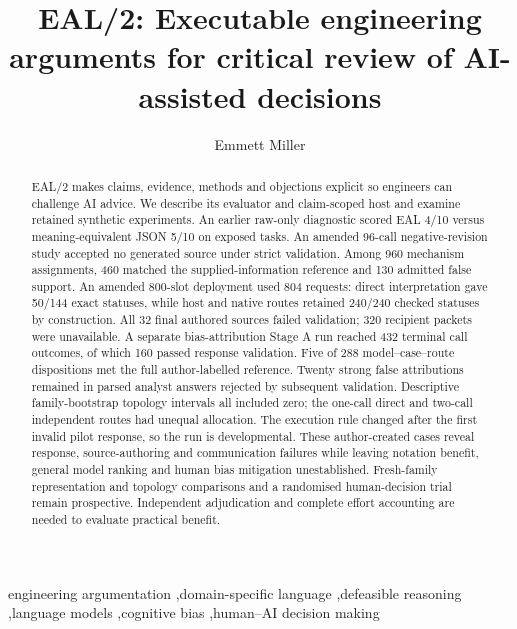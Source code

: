 \documentclass[preprint,12pt]{elsarticle}
\begin{document}
\begin{frontmatter}
\title{EAL/2: Executable engineering arguments for critical review of AI-assisted decisions}
\author[author]{Emmett Miller}
\address[author]{Affiliation and corresponding-author contact pending author confirmation}
\begin{abstract}
EAL/2 makes claims, evidence, methods and objections explicit so engineers can challenge AI advice. We describe its evaluator and claim-scoped host and examine retained synthetic experiments. An earlier raw-only diagnostic scored EAL 4/10 versus meaning-equivalent JSON 5/10 on exposed tasks. An amended 96-call negative-revision study accepted no generated source under strict validation. Among 960 mechanism assignments, 460 matched the supplied-information reference and 130 admitted false support. An amended 800-slot deployment used 804 requests: direct interpretation gave 50/144 exact statuses, while host and native routes retained 240/240 checked statuses by construction. All 32 final authored sources failed validation; 320 recipient packets were unavailable. A separate bias-attribution Stage A run reached 432 terminal call outcomes, of which 160 passed response validation. Five of 288 model--case--route dispositions met the full author-labelled reference. Twenty strong false attributions remained in parsed analyst answers rejected by subsequent validation. Descriptive family-bootstrap topology intervals all included zero; the one-call direct and two-call independent routes had unequal allocation. The execution rule changed after the first invalid pilot response, so the run is developmental. These author-created cases reveal response, source-authoring and communication failures while leaving notation benefit, general model ranking and human bias mitigation unestablished. Fresh-family representation and topology comparisons and a randomised human-decision trial remain prospective. Independent adjudication and complete effort accounting are needed to evaluate practical benefit.
\end{abstract}
\begin{keyword}
engineering argumentation \sep domain-specific language \sep defeasible reasoning \sep language models \sep cognitive bias \sep human--AI decision making
\end{keyword}
\end{frontmatter}
\end{document}

